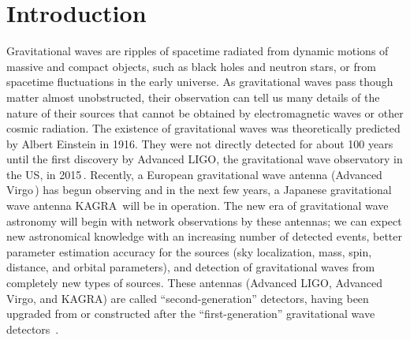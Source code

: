\documentclass[prd ,twocolumn ,secnumarabic,dvips
,amssymb, amsmath,nobibnotes, aps, prd,superscriptaddress]{revtex4-1}
\begin{document}
\maketitle


\section{Introduction}
%

Gravitational waves are ripples of spacetime radiated from dynamic motions of massive and compact 
objects, such as black holes and neutron stars, or from spacetime fluctuations in the early universe.
As gravitational waves pass though matter almost unobstructed, their observation can tell us many 
details of the nature of their sources that cannot be obtained by electromagnetic waves or other cosmic radiation.
The existence of gravitational waves was theoretically predicted by Albert Einstein in 1916. They were
not directly detected for about 100 years until the first discovery by Advanced LIGO, 
the gravitational wave observatory in the US, in 2015\,\cite{aLIGO}. 
Recently, a European gravitational
wave antenna (Advanced Virgo\,\cite{Virgo}) has begun observing and in the next few years, a Japanese
gravitational wave antenna KAGRA\,\cite{LCGT,KAGRA} will be in operation.
The new era of gravitational wave astronomy will begin with network observations by these antennas;
we can expect new astronomical knowledge with an increasing number of detected events, better parameter 
estimation accuracy for the sources (sky localization, mass, spin, distance, and orbital parameters),
and detection of gravitational waves from completely new types of sources.
These antennas (Advanced LIGO,  Advanced Virgo, and KAGRA) are called ``second-generation'' detectors,
having been upgraded from or constructed after the ``first-generation'' gravitational wave detectors
\,\cite{ref-LIGO, ref-VIRGO, ref-GEO, ref-TAMA}.
\end{document}
